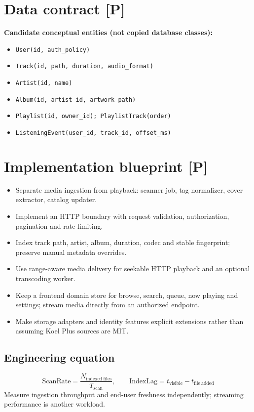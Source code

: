 \documentclass[10pt,a4paper,oneside]{report}
\begin{document}
\section{Data contract [P]}
\begin{evidencebox}\small\textbf{Candidate conceptual entities (not copied database classes):}\par
\begin{itemize}[leftmargin=*,itemsep=1pt,topsep=2pt]
\item \texttt{User(id, auth\_policy)}
\item \texttt{Track(id, path, duration, audio\_format)}
\item \texttt{Artist(id, name)}
\item \texttt{Album(id, artist\_id, artwork\_path)}
\item \texttt{Playlist(id, owner\_id); PlaylistTrack(order)}
\item \texttt{ListeningEvent(user\_id, track\_id, offset\_ms)}
\end{itemize}\end{evidencebox}
\section{Implementation blueprint [P]}
\begin{itemize}[leftmargin=*,itemsep=2pt,topsep=3pt]
\item Separate media ingestion from playback: scanner job, tag normalizer, cover extractor, catalog updater.
\item Implement an HTTP boundary with request validation, authorization, pagination and rate limiting.
\item Index track path, artist, album, duration, codec and stable fingerprint; preserve manual metadata overrides.
\item Use range-aware media delivery for seekable HTTP playback and an optional transcoding worker.
\item Keep a frontend domain store for browse, search, queue, now playing and settings; stream media directly from an authorized endpoint.
\item Make storage adapters and identity features explicit extensions rather than assuming Koel Plus sources are MIT.
\end{itemize}
\subsection*{Engineering equation}
\begin{equation*}\mathrm{ScanRate}=\frac{N_{\mathrm{indexed\ files}}}{T_{\mathrm{scan}}},\qquad \mathrm{IndexLag}=t_{\mathrm{visible}}-t_{\mathrm{file\ added}}\end{equation*}
Measure ingestion throughput and end-user freshness independently; streaming performance is another workload.\par
\end{document}
